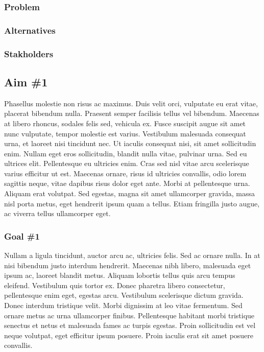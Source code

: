 	\subsubsection{Problem}

	\subsubsection{Alternatives}
	
	\subsubsection{Stakholders}


\subsection{Aim \#1}
Phasellus molestie non risus ac maximus. Duis velit orci, vulputate eu erat vitae, placerat bibendum nulla. Praesent semper facilisis tellus vel bibendum. Maecenas at libero rhoncus, sodales felis sed, vehicula ex. Fusce suscipit augue sit amet nunc vulputate, tempor molestie est varius. Vestibulum malesuada consequat urna, et laoreet nisi tincidunt nec. Ut iaculis consequat nisi, sit amet sollicitudin enim. Nullam eget eros sollicitudin, blandit nulla vitae, pulvinar urna. Sed eu ultrices elit. Pellentesque eu ultricies enim. Cras sed nisl vitae arcu scelerisque varius efficitur ut est. Maecenas ornare, risus id ultricies convallis, odio lorem sagittis neque, vitae dapibus risus dolor eget ante. Morbi at pellentesque urna. Aliquam erat volutpat. Sed egestas, magna sit amet ullamcorper gravida, massa nisl porta metus, eget hendrerit ipsum quam a tellus. Etiam fringilla justo augue, ac viverra tellus ullamcorper eget.

	\subsubsection{Goal \#1}
	Nullam a ligula tincidunt, auctor arcu ac, ultricies felis. Sed ac ornare nulla. In at nisi bibendum justo interdum hendrerit. Maecenas nibh libero, malesuada eget ipsum ac, laoreet blandit metus. Aliquam lobortis tellus quis arcu tempus eleifend. Vestibulum quis tortor ex. Donec pharetra libero consectetur, pellentesque enim eget, egestas arcu. Vestibulum scelerisque dictum gravida. Donec interdum tristique velit. Morbi dignissim at leo vitae fermentum. Sed ornare metus ac urna ullamcorper finibus. Pellentesque habitant morbi tristique senectus et netus et malesuada fames ac turpis egestas. Proin sollicitudin est vel neque volutpat, eget efficitur ipsum posuere. Proin iaculis erat sit amet posuere convallis.

